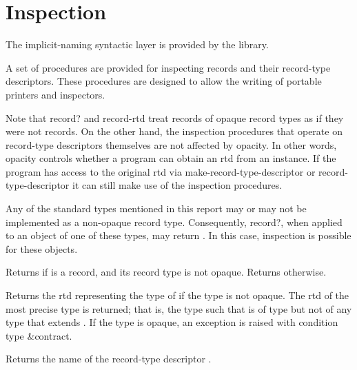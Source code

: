 \section{Inspection}

The implicit-naming syntactic layer is provided by the
 library.

A set of procedures are provided for inspecting records and their
record-type descriptors. These procedures are designed to allow the
writing of portable printers and inspectors.

Note that {\cf record?} and {\cf record-rtd} treat records of opaque
record types as if they were not records. On the other hand, the
inspection procedures that operate on record-type descriptors
themselves are not affected by opacity. In other words, opacity
controls whether a program can obtain an rtd from an instance. If the
program has access to the original rtd via {\cf
  make-record-type-descriptor} or {\cf record-type-descriptor} it can
still make use of the inspection procedures.

Any of the standard types mentioned in this report may or may not be
implemented as a non-opaque record type.  Consequently, {\cf record?},
when applied to an object of one of these types, may return
\schtrue{}.  In this case, inspection is possible for these objects.

\begin{entry}{%
}
   
Returns \schtrue{} if  is a record, and its record type is
not opaque. Returns \schfalse{} otherwise.  
\end{entry}

\begin{entry}{%
}
   
Returns the rtd representing the type of  if the type is not
opaque. The rtd of the most precise type is returned; that is, the
type  such that  is of type  but not of any
type that extends .  If the type is opaque, an exception is
raised with condition type {\cf\&contract}.
\end{entry}

\begin{entry}{%
}
   
Returns the name of the record-type descriptor .
\end{entry}   

